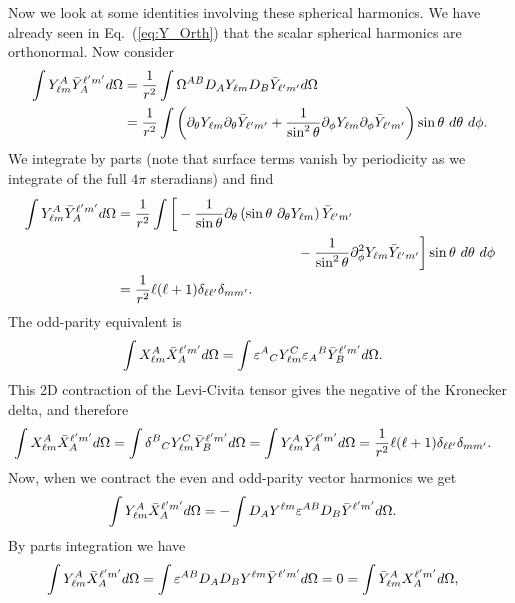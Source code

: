 \documentclass{article}
\begin{document}
Now we look at some identities involving these spherical harmonics.
We have already seen in Eq.~(\ref{eq:Y_Orth}) that
the scalar spherical harmonics are orthonormal.  Now consider
\begin{align}
\int Y^{A}_{\ell m} \bar Y_A^{\ell' m'}  d \Omega 
&=
\frac{1}{r^{2}} \int \Omega^{AB} D_{A} Y_{\ell m} D_B \bar Y_{\ell'm'}  d \Omega \\
&=
\frac{1}{r^{2}} \int \left( \partial_{\theta} Y_{\ell m} \partial_{\theta} \bar Y_{\ell'm'} 
+ \frac{1}{\sin^{2} \theta} \partial_{\phi} Y_{\ell m} \partial_{\phi} \bar Y_{\ell'm'}\right) 
\sin \theta \ d \theta \ d \phi .
\end{align}
We integrate by parts (note that surface terms vanish by periodicity
as we integrate of the full $4 \pi$ steradians) and find
\begin{align}
\int Y^{A}_{\ell m} \bar Y_A^{\ell' m'}  d \O 
&=
\frac{1}{r^{2}} \int \bigg[ - \frac{1}{\sin \th} \pa_{\th} \l \sin \th \ \pa_{\th} Y_{\ell m} \r  \bar Y_{\ell'm'} \nonumber \\
& \hspace{30ex}
- \frac{1}{\sin^{2} \th} \pa_{\phi}^{2} Y_{\ell m}  \bar Y_{\ell'm'}\bigg] 
\sin \th \ d \th \ d \phi \\
& = \frac{1}{r^{2}} \ell (\ell+1) \d_{\ell \ell'} \d_{m m'}.
\end{align}
The odd-parity equivalent is
\begin{align}
\int X^{A}_{\ell m} \bar X_A^{\ell' m'}  d \Omega 
&=
\int {\varepsilon^{A}}_{C} Y^{C}_{\ell m} {\varepsilon_{A}}^{B} \bar Y_B^{\ell' m'}  d \Omega .
\end{align}
This 2D contraction of the Levi-Civita tensor gives 
the negative of the Kronecker delta, and therefore
\begin{align}
\int X^{A}_{\ell m} \bar X_A^{\ell' m'}  d \Omega 
&= \int {\delta^{B}}_{C} Y^{C}_{\ell m}  \bar Y_B^{\ell' m'}  d \Omega  
= \int Y^{A}_{\ell m} \bar Y_A^{\ell' m'}  d \Omega 
= \frac{1}{r^{2}} \ell (\ell+1) \delta_{\ell \ell'} \delta_{m m'}.
\end{align}
Now, when we contract the even and odd-parity vector harmonics we get
\begin{align}
\int Y^{A}_{\ell m} \bar X_A^{\ell' m'}  d \Omega 
&= 
-\int D_{A} Y^{\ell m} \varepsilon^{AB} D_{B} \bar Y^{\ell' m'}  d \Omega .
\end{align}
By parts integration we have
\begin{align}
\int Y^{A}_{\ell m} \bar X_A^{\ell' m'}  d \Omega 
&= 
\int \varepsilon^{AB} D_{A} D_{B} Y^{\ell m}\bar Y^{\ell' m'}  d \Omega  = 0
= \int \bar Y^{A}_{\ell m}  X_A^{\ell' m'}  d \Omega ,
\end{align}
\end{document}
